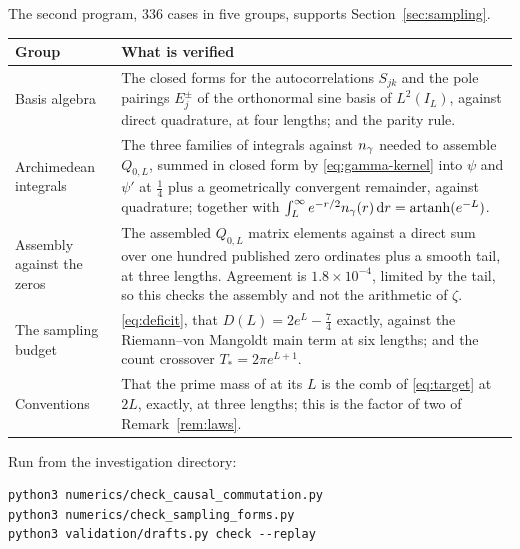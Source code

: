 The second program, $336$ cases in five groups, supports
Section~\ref{sec:sampling}.

\begin{center}
\begin{tabular}{@{}p{}p{}@{}}
\toprule
Group & What is verified\\
\midrule
Basis algebra &
The closed forms for the autocorrelations $S_{jk}$ and the pole pairings
$E_j^{\pm}$ of the orthonormal sine basis of $L^2(I_L)$, against direct
quadrature, at four lengths; and the parity rule.\\
Archimedean integrals &
The three families of integrals against $n_{\gamma}$ needed to assemble $Q_{0,L}$,
summed in closed form by \eqref{eq:gamma-kernel} into $\psi$ and $\psi'$ at
$\frac14$ plus a geometrically convergent remainder, against quadrature; together
with $\int_L^\infty e^{-r/2}n_{\gamma}(r)\,\mathrm d r=\operatorname{artanh}(e^{-L})$.\\
Assembly against the zeros &
The assembled $Q_{0,L}$ matrix elements against a direct sum over one hundred
published zero ordinates plus a smooth tail, at three lengths. Agreement is
$1.8\times10^{-4}$, limited by the tail, so this checks the assembly and not the
arithmetic of $\zeta$.\\
The sampling budget &
\eqref{eq:deficit}, that $D(L)=2e^L-\frac74$ exactly, against the
Riemann--von Mangoldt main term at six lengths; and the count crossover
$T_*=2\pi e^{L+1}$.\\
Conventions &
That the prime mass of \cite{ZhuCompact} at its $L$ is the comb of
\eqref{eq:target} at $2L$, exactly, at three lengths; this is the factor of two
of Remark~\ref{rem:laws}.\\
\bottomrule
\end{tabular}
\end{center}

Run from the investigation directory:
\begin{verbatim}
python3 numerics/check_causal_commutation.py
python3 numerics/check_sampling_forms.py
python3 validation/drafts.py check --replay
\end{verbatim}

